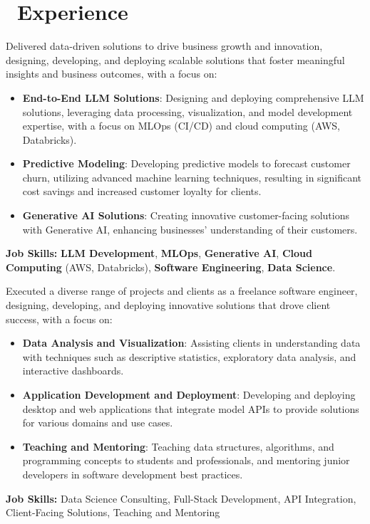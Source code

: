 \section{\texorpdfstring{\faHistory}{}\ Experience}

Delivered data-driven solutions to drive business growth and innovation, designing, developing, and deploying scalable solutions that foster meaningful insights and business outcomes, with a focus on:
\begin{itemize}[parsep=0.5ex]
    \item \textbf{End-to-End LLM Solutions}: Designing and deploying comprehensive LLM solutions, leveraging data processing, visualization, and model development expertise, with a focus on MLOps (CI/CD) and cloud computing (AWS, Databricks).
    \item \textbf{Predictive Modeling}: Developing predictive models to forecast customer churn, utilizing advanced machine learning techniques, resulting in significant cost savings and increased customer loyalty for clients.
    \item \textbf{Generative AI Solutions}: Creating innovative customer-facing solutions with Generative AI, enhancing businesses' understanding of their customers.
\end{itemize}
\small{\textbf{Job Skills:}
    \textbf{LLM Development}, \textbf{MLOps}, \textbf{Generative AI}, \textbf{Cloud Computing} (AWS, Databricks), \textbf{Software Engineering}, \textbf{Data Science}.
}


Executed a diverse range of projects and clients as a freelance software engineer, designing, developing, and deploying innovative solutions that drove client success, with a focus on:
\begin{itemize}[parsep=0.5ex]
    \item \textbf{Data Analysis and Visualization}: Assisting clients in understanding data with techniques such as descriptive statistics, exploratory data analysis, and interactive dashboards.
    \item \textbf{Application Development and Deployment}: Developing and deploying desktop and web applications that integrate model APIs to provide solutions for various domains and use cases.
    \item \textbf{Teaching and Mentoring}: Teaching data structures, algorithms, and programming concepts to students and professionals, and mentoring junior developers in software development best practices.
\end{itemize}
\small{\textbf{Job Skills:}
    Data Science Consulting, Full-Stack Development, API Integration, Client-Facing Solutions, Teaching and Mentoring
}